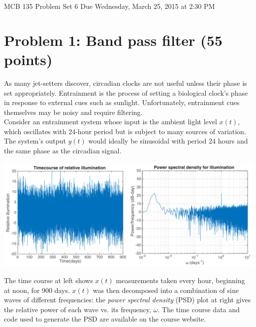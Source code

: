 \documentclass{article}
\begin{document}
\large

MCB 135 Problem Set 6 \hfill Due Wednesday, March 25, 2015 at 2:30 PM

\section*{Problem 1: Band pass filter (55 points)}

As many jet-setters discover, circadian clocks are not useful unless their phase is set appropriately. Entrainment is the process of setting a biological clock's phase in response to external cues such as sunlight. Unfortunately, entrainment cues themselves may be noisy and require filtering.\\

Consider an entrainment system whose input is the ambient light level $x(t)$, which oscillates with 24-hour period but is subject to many sources of variation. The system's output $y(t)$ would ideally be sinusoidal with period 24 hours and the same phase as the circadian signal.\\

\begin{center}
\includegraphics[width=.7\textwidth]{sun.pdf}
\end{center}

The time course at left shows $x(t)$ measurements taken every hour, beginning at noon, for 900 days. $x(t)$ was then decomposed into a combination of sine waves of different frequencies: the \textit{power spectral density }(PSD) plot at right gives the relative power of each wave vs. its frequency, $\omega$. The time course data and code used to generate the PSD are available on the course website.
\end{document}
